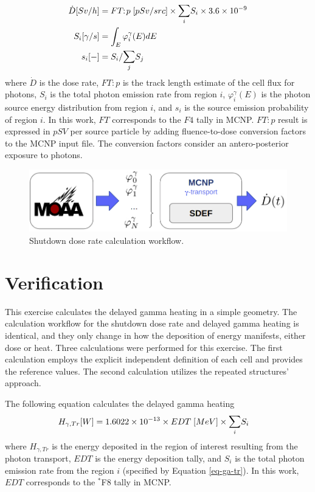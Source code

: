 \begin{align}
\dot{D}[Sv/h] &=  FT\!\!:\!p \; [pSv/src] \times \mathlarger{\sum}_i S_i \times 3.6 \times 10^{-9} \label{eq-dose} \\
S_i[\gamma/s] &= \int_{E} \varphi^\gamma_i(E) dE \\
s_i [-] &= S_i / \mathlarger{\sum}_j S_j
\end{align}
where $\dot{D}$ is the dose rate, $FT\!\!:\!p$ is the track length estimate of the cell flux for photons, $S_i$ is the total photon emission rate from region $i$, $\varphi^\gamma_i(E)$ is the photon source energy distribution from region $i$, and $s_i$ is the source emission probability of region $i$.
In this work, $FT$ corresponds to the $F4$ tally in MCNP.
$FT\!\!:\!p$ result is expressed in $pSV$ per source particle by adding fluence-to-dose conversion factors \cite{icrp_116} to the MCNP input file.
The conversion factors consider an antero-posterior exposure to photons.

\begin{figure}[htbp!]
  \begin{center}
    \includegraphics[width=0.85\linewidth]{figures/dose-flow}
  \end{center}
  \caption{Shutdown dose rate calculation workflow.}
  \label{fig:workflow_4}
\end{figure}


\section{Verification}
\label{sec:verif}

This exercise calculates the delayed gamma heating in a simple geometry.
The calculation workflow for the shutdown dose rate and delayed gamma heating is identical, and they only change in how the deposition of energy manifests, either dose or heat.
Three calculations were performed for this exercise.
The first calculation employs the explicit independent definition of each cell and provides the reference values.
The second calculation utilizes the repeated structures' approach.

The following equation calculates the delayed gamma heating
\begin{align}
H_{\gamma, Tr} [W] &= 1.6022 \times 10^{-13} \times EDT \; [MeV] \times \mathlarger{\sum}_i S_i
\end{align}
where $H_{\gamma, Tr}$ is the energy deposited in the region of interest resulting from the photon transport, $EDT$ is the energy deposition tally, and $S_i$ is the total photon emission rate from the region $i$ (specified by Equation \ref{eq-ga-tr}).
In this work, $EDT$ corresponds to the $^\ast$F8 tally in MCNP.

